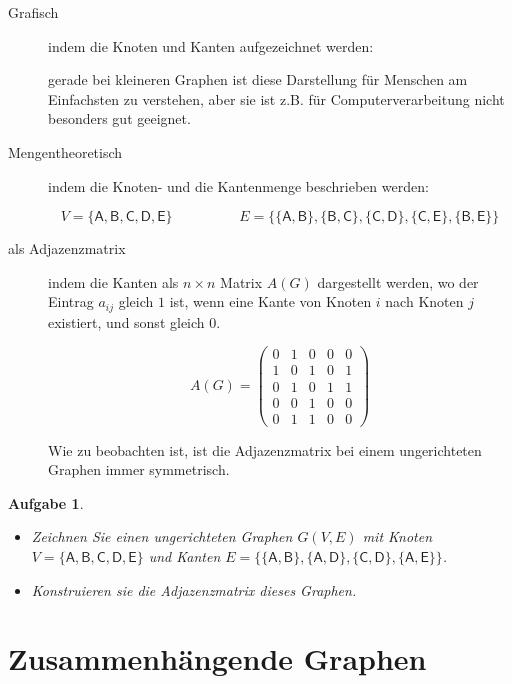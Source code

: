 \documentclass[12pt,a4paper]{report}
\theoremstyle{break}
\newtheorem{exercise}{Aufgabe}[section]
\theoremstyle{plain}
\begin{document}
\begin{description}
\item[Grafisch] indem die Knoten und Kanten aufgezeichnet werden:


gerade bei kleineren Graphen ist diese Darstellung f\"{u}r Menschen am
Einfachsten zu verstehen, aber sie ist z.B. f\"{u}r
Computerverarbeitung nicht besonders gut geeignet.
\item[Mengentheoretisch] indem die Knoten- und die Kantenmenge
  beschrieben werden:

\begin{displaymath}
V = \{\mathsf{A,B,C,D,E}\}\hspace{2cm}E = \{\mathsf{\{A,B\}, \{B,C\},
  \{C,D\}, \{C,E\}, \{B,E\}}\}
\end{displaymath}

\item[\textnormal{als} Adjazenzmatrix] indem die Kanten als $n\times{n}$ Matrix $A(G)$
  dargestellt werden, wo der Eintrag $a_{ij}$ gleich $1$ ist, wenn eine Kante
  von Knoten $i$ nach Knoten $j$ existiert, und sonst gleich $0$.

\begin{displaymath}
A(G) = \left( 
\begin{array}{ccccc}
0 & 1 & 0 & 0 & 0 \\
1 & 0 & 1 & 0 & 1 \\
0 & 1 & 0 & 1 & 1 \\
0 & 0 & 1 & 0 & 0 \\
0 & 1 & 1 & 0 & 0 
\end{array}
\right)
\end{displaymath}

Wie zu beobachten ist, ist die Adjazenzmatrix bei einem ungerichteten
Graphen immer symmetrisch.
\end{description}

\begin{exercise}\label{exrep}
\begin{itemize}
\item Zeichnen Sie einen ungerichteten Graphen $G(V,E)$ mit Knoten 
$V = \{\mathsf{A,B,C,D,E}\}$ und Kanten 
$E = \{\mathsf{\{A, B\}, \{A, D\}, \{C, D\}, \{A, E\}}\}$.
\item Konstruieren sie die Adjazenzmatrix dieses Graphen.
\end{itemize}
\end{exercise}

\section{Zusammenh\"{a}ngende Graphen}
\end{document}
